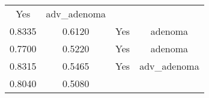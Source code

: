 \documentclass[12pt,]{article}
\begin{document}
\begin{longtable}[]{@{}cccc@{}}
\begin{minipage}[t]{0.22\columnwidth}
Yes\strut
\end{minipage} & \begin{minipage}[t]{0.16\columnwidth}\centering\strut
adv\_adenoma\strut
\end{minipage}\tabularnewline
\begin{minipage}[t]{0.24\columnwidth}\centering\strut
0.8335\strut
\end{minipage} & \begin{minipage}[t]{0.26\columnwidth}\centering\strut
0.6120\strut
\end{minipage} & \begin{minipage}[t]{0.22\columnwidth}\centering\strut
Yes\strut
\end{minipage} & \begin{minipage}[t]{0.16\columnwidth}\centering\strut
adenoma\strut
\end{minipage}\tabularnewline
\begin{minipage}[t]{0.24\columnwidth}\centering\strut
0.7700\strut
\end{minipage} & \begin{minipage}[t]{0.26\columnwidth}\centering\strut
0.5220\strut
\end{minipage} & \begin{minipage}[t]{0.22\columnwidth}\centering\strut
Yes\strut
\end{minipage} & \begin{minipage}[t]{0.16\columnwidth}\centering\strut
adenoma\strut
\end{minipage}\tabularnewline
\begin{minipage}[t]{0.24\columnwidth}\centering\strut
0.8315\strut
\end{minipage} & \begin{minipage}[t]{0.26\columnwidth}\centering\strut
0.5465\strut
\end{minipage} & \begin{minipage}[t]{0.22\columnwidth}\centering\strut
Yes\strut
\end{minipage} & \begin{minipage}[t]{0.16\columnwidth}\centering\strut
adv\_adenoma\strut
\end{minipage}\tabularnewline
\begin{minipage}[t]{0.24\columnwidth}\centering\strut
0.8040\strut
\end{minipage} & \begin{minipage}[t]{0.26\columnwidth}\centering\strut
0.5080\strut
\end{minipage} & \begin{minipage}[t]{0.22\columnwidth}\centering\strut

\end{minipage}
\end{longtable}
\end{document}
